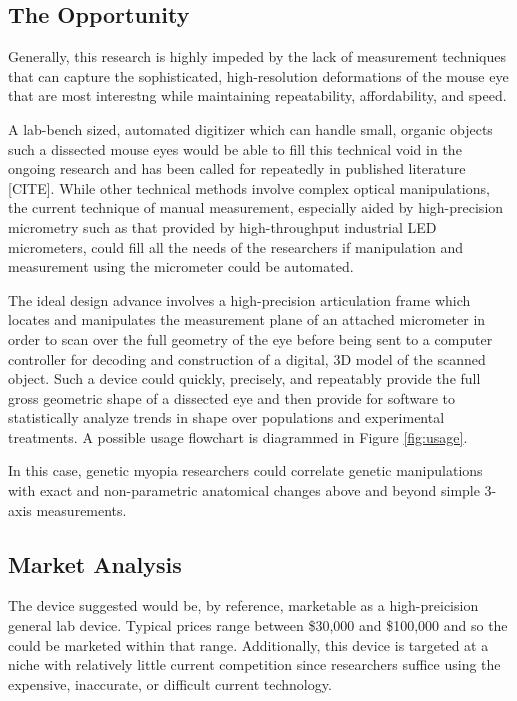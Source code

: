 \documentclass{article}
\begin{document}
\subsection{The Opportunity}
\label{sec:opportunity}

Generally, this research is highly impeded by the lack of measurement
techniques that can capture the sophisticated, high-resolution
deformations of the mouse eye that are most interestng while
maintaining repeatability, affordability, and speed.

A lab-bench sized, automated digitizer which can handle small, organic
objects such a dissected mouse eyes would be able to fill this
technical void in the ongoing research and has been called for
repeatedly in published literature [CITE]. While other technical
methods involve complex optical manipulations, the current technique
of manual measurement, especially aided by high-precision micrometry
such as that provided by high-throughput industrial LED micrometers,
could fill all the needs of the researchers if manipulation and
measurement using the micrometer could be automated.

The ideal design advance involves a high-precision articulation frame
which locates and manipulates the measurement plane of an attached
micrometer in order to scan over the full geometry of the eye before
being sent to a computer controller for decoding and construction of a
digital, 3D model of the scanned object. Such a device could quickly,
precisely, and repeatably provide the full gross geometric shape of a
dissected eye and then provide for software to statistically analyze
trends in shape over populations and experimental treatments. A possible usage flowchart is diagrammed in Figure \ref{fig:usage}.

In this case, genetic myopia researchers could correlate genetic
manipulations with exact and non-parametric anatomical changes above
and beyond simple 3-axis measurements.

\subsection{Market Analysis}
\label{sec:market-analysis}

The device suggested would be, by reference, marketable as a
high-preicision general lab device. Typical prices range between
\$30,000 and \$100,000 and so the could be marketed within that
range. Additionally, this device is targeted at a niche with
relatively little current competition since researchers suffice using
the expensive, inaccurate, or difficult current technology.
\end{document}
